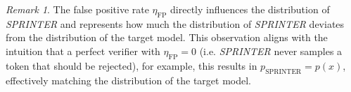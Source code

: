 \documentclass{article}
\theoremstyle{plain}
\theoremstyle{definition}
\theoremstyle{remark}
\newtheorem{remark}[theorem]{Remark}
\begin{document}

\begin{remark}
The false positive rate $\eta_\text{FP}$ directly influences the distribution of \textit{SPRINTER} and represents how much the distribution of \textit{SPRINTER} deviates from the distribution of the target model. This observation aligns with the intuition that a perfect verifier with $\eta_\text{FP} =0$ (i.e. \textit{SPRINTER} never samples a token that should be rejected), for example, this results in $p_\text{SPRINTER} = p(x)$, effectively matching the distribution of the target model. 
\end{remark}
\end{document}
